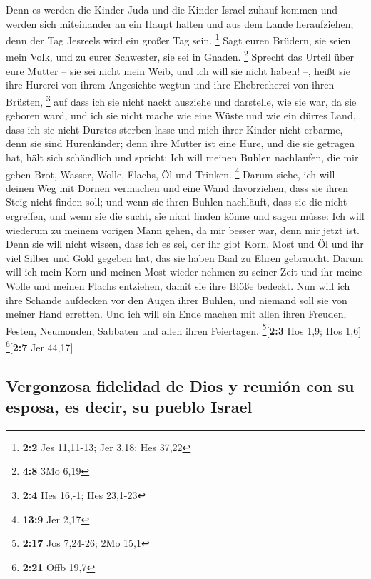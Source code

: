  Denn es werden die Kinder Juda und die Kinder Israel
zuhauf kommen und werden sich miteinander an ein Haupt halten und aus
dem Lande heraufziehen; denn der Tag Jesreels wird ein großer Tag sein.
\footnote{\textbf{2:2} Jes 11,11-13; Jer 3,18; Hes 37,22} 
Sagt euren Brüdern, sie seien mein Volk, und zu eurer Schwester, sie sei
in Gnaden. \footnote{\textbf{4:8} 3Mo 6,19}  Sprecht das
Urteil über eure Mutter -- sie sei nicht mein Weib, und ich will sie
nicht haben! --, heißt sie ihre Hurerei von ihrem Angesichte wegtun und
ihre Ehebrecherei von ihren Brüsten, \footnote{\textbf{2:4} Hes 16,-1;
  Hes 23,1-23}  auf dass ich sie nicht nackt ausziehe und
darstelle, wie sie war, da sie geboren ward, und ich sie nicht mache wie
eine Wüste und wie ein dürres Land, dass ich sie nicht Durstes sterben
lasse  und mich ihrer Kinder nicht erbarme, denn sie sind
Hurenkinder;  denn ihre Mutter ist eine Hure, und die sie
getragen hat, hält sich schändlich und spricht: Ich will meinen Buhlen
nachlaufen, die mir geben Brot, Wasser, Wolle, Flachs, Öl und Trinken.
\footnote{\textbf{13:9} Jer 2,17}  Darum siehe, ich will
deinen Weg mit Dornen vermachen und eine Wand davorziehen, dass sie
ihren Steig nicht finden soll;  und wenn sie ihren Buhlen
nachläuft, dass sie die nicht ergreifen, und wenn sie die sucht, sie
nicht finden könne und sagen müsse: Ich will wiederum zu meinem vorigen
Mann gehen, da mir besser war, denn mir jetzt ist.  Denn
sie will nicht wissen, dass ich es sei, der ihr gibt Korn, Most und Öl
und ihr viel Silber und Gold gegeben hat, das sie haben Baal zu Ehren
gebraucht.  Darum will ich mein Korn und meinen Most
wieder nehmen zu seiner Zeit und ihr meine Wolle und meinen Flachs
entziehen, damit sie ihre Blöße bedeckt.  Nun will ich
ihre Schande aufdecken vor den Augen ihrer Buhlen, und niemand soll sie
von meiner Hand erretten.  Und ich will ein Ende machen
mit allen ihren Freuden, Festen, Neumonden, Sabbaten und allen ihren
Feiertagen. \footnote{\textbf{2:17} Jos 7,24-26; 2Mo 15,1}{[}\textbf{2:3}
Hos 1,9; Hos 1,6{]} \footnote{\textbf{2:21} Offb 19,7}{[}\textbf{2:7}
Jer 44,17{]}

\hypertarget{vergonzosa-fidelidad-de-dios-y-reuniuxf3n-con-su-esposa-es-decir-su-pueblo-israel}{%
\subsection{Vergonzosa fidelidad de Dios y reunión con su esposa, es
decir, su pueblo
Israel}\label{vergonzosa-fidelidad-de-dios-y-reuniuxf3n-con-su-esposa-es-decir-su-pueblo-israel}}

